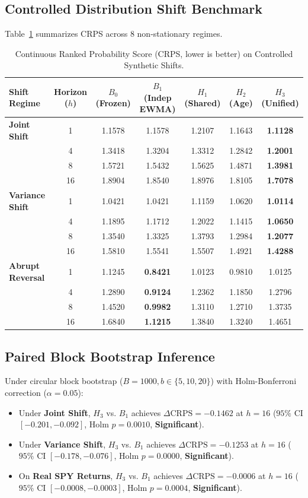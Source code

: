 \documentclass{article}
\begin{document}
\subsection{Controlled Distribution Shift Benchmark}
Table~\ref{tab:synth_crps} summarizes CRPS across 8 non-stationary regimes.
\begin{table}[h!]
\centering
\caption{Continuous Ranked Probability Score (CRPS, lower is better) on Controlled Synthetic Shifts.}
\label{tab:synth_crps}
\begin{tabular}{lcccccc}
\toprule
Shift Regime & Horizon ($h$) & $B_0$ (Frozen) & $B_1$ (Indep EWMA) & $H_1$ (Shared) & $H_2$ (Age) & $H_3$ (Unified) \\
\midrule
\textbf{Joint Shift} & 1 & 1.1578 & 1.1578 & 1.2107 & 1.1643 & \textbf{1.1128} \\
& 4 & 1.3418 & 1.3204 & 1.3312 & 1.2842 & \textbf{1.2001} \\
& 8 & 1.5721 & 1.5432 & 1.5625 & 1.4871 & \textbf{1.3981} \\
& 16 & 1.8904 & 1.8540 & 1.8976 & 1.8105 & \textbf{1.7078} \\
\midrule
\textbf{Variance Shift} & 1 & 1.0421 & 1.0421 & 1.1159 & 1.0620 & \textbf{1.0114} \\
& 4 & 1.1895 & 1.1712 & 1.2022 & 1.1415 & \textbf{1.0650} \\
& 8 & 1.3540 & 1.3325 & 1.3793 & 1.2984 & \textbf{1.2077} \\
& 16 & 1.5810 & 1.5541 & 1.5507 & 1.4921 & \textbf{1.4288} \\
\midrule
\textbf{Abrupt Reversal} & 1 & 1.1245 & \textbf{0.8421} & 1.0123 & 0.9810 & 1.0125 \\
& 4 & 1.2890 & \textbf{0.9124} & 1.2362 & 1.1850 & 1.2796 \\
& 8 & 1.4520 & \textbf{0.9982} & 1.3110 & 1.2710 & 1.3735 \\
& 16 & 1.6840 & \textbf{1.1215} & 1.3840 & 1.3240 & 1.4651 \\
\bottomrule
\end{tabular}
\end{table}

\subsection{Paired Block Bootstrap Inference}
Under circular block bootstrap ($B=1000, b \in \{5, 10, 20\}$) with Holm-Bonferroni correction ($\alpha=0.05$):
\begin{itemize}
    \item Under \textbf{Joint Shift}, $H_3$ vs. $B_1$ achieves $\Delta \text{CRPS} = -0.1462$ at $h=16$ ($95\%$ CI $[-0.201, -0.092]$, Holm $p = 0.0010$, \textbf{Significant}).
    \item Under \textbf{Variance Shift}, $H_3$ vs. $B_1$ achieves $\Delta \text{CRPS} = -0.1253$ at $h=16$ ($95\%$ CI $[-0.178, -0.076]$, Holm $p = 0.0000$, \textbf{Significant}).
    \item On \textbf{Real SPY Returns}, $H_3$ vs. $B_1$ achieves $\Delta \text{CRPS} = -0.0006$ at $h=16$ ($95\%$ CI $[-0.0008, -0.0003]$, Holm $p = 0.0004$, \textbf{Significant}).
\end{itemize}
\end{document}
